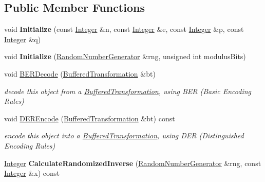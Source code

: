 \subsection*{Public Member Functions}
\begin{DoxyCompactItemize}
\item 
\hypertarget{class_invertible_e_s_i_g_n_function_a43215778d1630a0037a794d815dac5d6}{
void {\bfseries Initialize} (const \hyperlink{class_integer}{Integer} \&n, const \hyperlink{class_integer}{Integer} \&e, const \hyperlink{class_integer}{Integer} \&p, const \hyperlink{class_integer}{Integer} \&q)}
\label{class_invertible_e_s_i_g_n_function_a43215778d1630a0037a794d815dac5d6}

\item 
\hypertarget{class_invertible_e_s_i_g_n_function_a4ebace71d71f1e3d49bbb506105789e7}{
void {\bfseries Initialize} (\hyperlink{class_random_number_generator}{RandomNumberGenerator} \&rng, unsigned int modulusBits)}
\label{class_invertible_e_s_i_g_n_function_a4ebace71d71f1e3d49bbb506105789e7}

\item 
\hypertarget{class_invertible_e_s_i_g_n_function_a7e63d8fe66a25af6611f37bdaac982c4}{
void \hyperlink{class_invertible_e_s_i_g_n_function_a7e63d8fe66a25af6611f37bdaac982c4}{BERDecode} (\hyperlink{class_buffered_transformation}{BufferedTransformation} \&bt)}
\label{class_invertible_e_s_i_g_n_function_a7e63d8fe66a25af6611f37bdaac982c4}

\begin{DoxyCompactList}\small\item\em decode this object from a \hyperlink{class_buffered_transformation}{BufferedTransformation}, using BER (Basic Encoding Rules) \item\end{DoxyCompactList}\item 
\hypertarget{class_invertible_e_s_i_g_n_function_a7c12cab3cb37c52da87672ef1bc33f13}{
void \hyperlink{class_invertible_e_s_i_g_n_function_a7c12cab3cb37c52da87672ef1bc33f13}{DEREncode} (\hyperlink{class_buffered_transformation}{BufferedTransformation} \&bt) const }
\label{class_invertible_e_s_i_g_n_function_a7c12cab3cb37c52da87672ef1bc33f13}

\begin{DoxyCompactList}\small\item\em encode this object into a \hyperlink{class_buffered_transformation}{BufferedTransformation}, using DER (Distinguished Encoding Rules) \item\end{DoxyCompactList}\item 
\hypertarget{class_invertible_e_s_i_g_n_function_a905be1ca12abad6fd3d8e862d713b7c7}{
\hyperlink{class_integer}{Integer} {\bfseries CalculateRandomizedInverse} (\hyperlink{class_random_number_generator}{RandomNumberGenerator} \&rng, const \hyperlink{class_integer}{Integer} \&x) const }
\label{class_invertible_e_s_i_g_n_function_a905be1ca12abad6fd3d8e862d713b7c7}


\end{DoxyCompactItemize}
